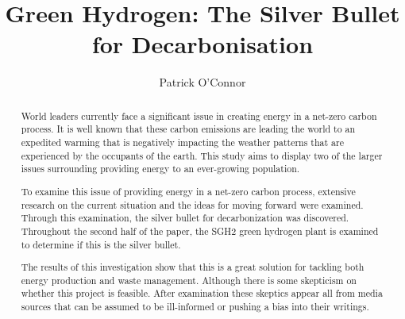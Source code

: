 \documentclass[3p,sort]{elsarticle}
\begin{document}
\begin{frontmatter}

\title{Green Hydrogen: The Silver Bullet for Decarbonisation}
\author{Patrick O'Connor}
\address{Geography of Energy Resources, GPHY 326}






\begin{abstract}
World leaders currently face a significant issue in creating energy in a net-zero carbon process. It is 
well known that these carbon emissions are leading the world to an expedited warming that is negatively 
impacting the weather patterns that are experienced by the occupants of the earth. 
This study aims to display two 
of the larger issues surrounding providing energy to an ever-growing population.
    
To examine this issue of providing energy in a net-zero carbon process, extensive research on the current situation and the ideas for moving forward were examined. Through this examination, the silver bullet for decarbonization was discovered. Throughout the second half of the paper, the SGH2 green hydrogen plant is 
examined to determine if this is the silver bullet. 
    
The results of this investigation show that this is a great solution for tackling both energy production and
waste management. 
Although there is some skepticism on whether this project is feasible. After examination these skeptics 
appear all from media sources that can be assumed to be ill-informed or pushing a bias into their writings.
\end{abstract}

\end{frontmatter}
\end{document}
